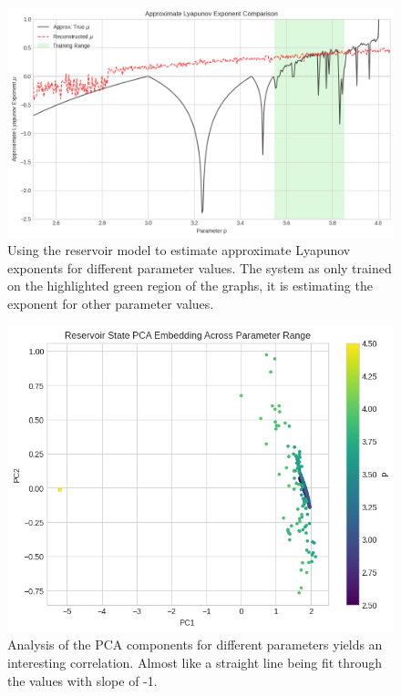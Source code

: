 \documentclass[numbered]{ivt-style/standard}
\begin{document}
\begin{figure}[H]
    \centering
    \includegraphics[width=1\linewidth]{figures/lyapanov_bd_rd.png}
    \caption{Using the reservoir model to estimate approximate Lyapunov exponents for different parameter values. The system as only trained on the highlighted green region of the graphs, it is estimating the exponent for other parameter values.}
    \label{fig:lypanov_bd_rc}
\end{figure}


\begin{figure}[H]
    \centering
    \includegraphics[width=0.8\linewidth]{figures/bd_elm_pca_analysis.png}
    \caption{Analysis of the PCA components for different parameters yields an interesting correlation. Almost like a straight line being fit through the values with slope of -1. }
    \label{fig:bd_4}
\end{figure}
\end{document}
